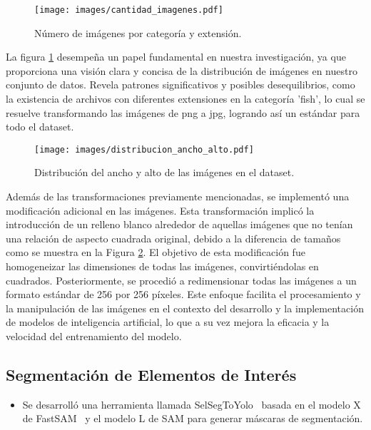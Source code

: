 \documentclass[journal]{IEEEtran}
\begin{document}
\begin{figure}[!h]
  \centering
  \texttt{[image: images/cantidad\_imagenes.pdf]}
  \caption{Número de imágenes por categoría y extensión.}
  \label{fig:cantidad_imagenes}
\end{figure}

La figura \ref{fig:cantidad_imagenes} desempeña un papel fundamental en nuestra investigación, ya que proporciona una visión clara y concisa de la distribución de imágenes en nuestro conjunto de datos. Revela patrones significativos y posibles desequilibrios, como la existencia de archivos con diferentes extensiones en la categoría 'fish', lo cual se resuelve transformando las imágenes de png a jpg, logrando así un estándar para todo el dataset.

\begin{figure}[!h]
  \centering
  \texttt{[image: images/distribucion\_ancho\_alto.pdf]}
  \caption{Distribución del ancho y alto de las imágenes en el dataset.}
  \label{fig:distribucion_ancho_alto}
\end{figure}

Además de las transformaciones previamente mencionadas, se implementó una modificación adicional en las imágenes. Esta transformación implicó la introducción de un relleno blanco alrededor de aquellas imágenes que no tenían una relación de aspecto cuadrada original, debido a la diferencia de tamaños como se muestra en la Figura \ref{fig:distribucion_ancho_alto}. El objetivo de esta modificación fue homogeneizar las dimensiones de todas las imágenes, convirtiéndolas en cuadrados. Posteriormente, se procedió a redimensionar todas las imágenes a un formato estándar de 256 por 256 píxeles. Este enfoque facilita el procesamiento y la manipulación de las imágenes en el contexto del desarrollo y la implementación de modelos de inteligencia artificial, lo que a su vez mejora la eficacia y la velocidad del entrenamiento del modelo.


\subsection{Segmentación de Elementos de Interés}

\begin{itemize}
    \item Se desarrolló una herramienta llamada SelSegToYolo~\cite{SelSegToYolo} basada en el modelo X de FastSAM~\cite{FastSAM} y el modelo L de SAM para generar máscaras de segmentación.
   
\end{itemize}
\end{document}
